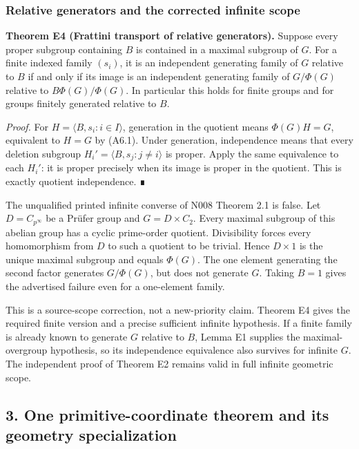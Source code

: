 \documentclass[
  10pt,
  letterpaper,
]{article}
\begin{document}
\subsubsection{Relative generators and the corrected infinite
scope}\label{relative-generators-and-the-corrected-infinite-scope}

\textbf{Theorem E4 (Frattini transport of relative generators).} Suppose
every proper subgroup containing \(B\) is contained in a maximal
subgroup of \(G\). For a finite indexed family \((s_i)\), it is an
independent generating family of \(G\) relative to \(B\) if and only if
its image is an independent generating family of \(G/\Phi(G)\) relative
to \(B\Phi(G)/\Phi(G)\). In particular this holds for finite groups and
for groups finitely generated relative to \(B\).

\emph{Proof.} For \(H=\langle B,s_i:i\in I\rangle\), generation in the
quotient means \(\Phi(G)H=G\), equivalent to \(H=G\) by (A6.1). Under
generation, independence means that every deletion subgroup
\(H_i'=\langle B,s_j:j\ne i\rangle\) is proper. Apply the same
equivalence to each \(H_i'\): it is proper precisely when its image is
proper in the quotient. This is exactly quotient independence. ∎

The unqualified printed infinite converse of N008 Theorem 2.1 is false.
Let \(D=C_{p^\infty}\) be a Prüfer group and \(G=D\times C_2\). Every
maximal subgroup of this abelian group has a cyclic prime-order
quotient. Divisibility forces every homomorphism from \(D\) to such a
quotient to be trivial. Hence \(D\times1\) is the unique maximal
subgroup and equals \(\Phi(G)\). The one element generating the second
factor generates \(G/\Phi(G)\), but does not generate \(G\). Taking
\(B=1\) gives the advertised failure even for a one-element family.

This is a source-scope correction, not a new-priority claim. Theorem E4
gives the required finite version and a precise sufficient infinite
hypothesis. If a finite family is already known to generate \(G\)
relative to \(B\), Lemma E1 supplies the maximal-overgroup hypothesis,
so its independence equivalence also survives for infinite \(G\). The
independent proof of Theorem E2 remains valid in full infinite geometric
scope.

\subsection{3. One primitive-coordinate theorem and its geometry
specialization}\label{one-primitive-coordinate-theorem-and-its-geometry-specialization}
\end{document}
